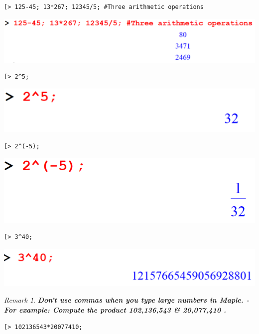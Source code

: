 \documentclass[
]{book}
\theoremstyle{definition}
\theoremstyle{definition}
\theoremstyle{definition}
\theoremstyle{definition}
\theoremstyle{remark}
\newtheorem*{remark}{Remark}
\begin{document}
\begin{verbatim}
[> 125-45; 13*267; 12345/5; #Three arithmetic operations
\end{verbatim}

\includegraphics{figures/Lesson 1/fig9.png}

\begin{verbatim}
[> 2^5;
\end{verbatim}

\includegraphics{figures/Lesson 1/fig10.png}

\begin{verbatim}
[> 2^(-5);
\end{verbatim}

\includegraphics{figures/Lesson 1/fig11.png}

\begin{verbatim}
[> 3^40;
\end{verbatim}

\includegraphics{figures/Lesson 1/fig12.png}

\begin{remark}
\textbf{\emph{Don't use commas when you type large numbers in Maple.
- For example: Compute the product 102,136,543 \& 20,077,410 .}}
\end{remark}

\begin{verbatim}
[> 102136543*20077410;
\end{verbatim}
\end{document}
